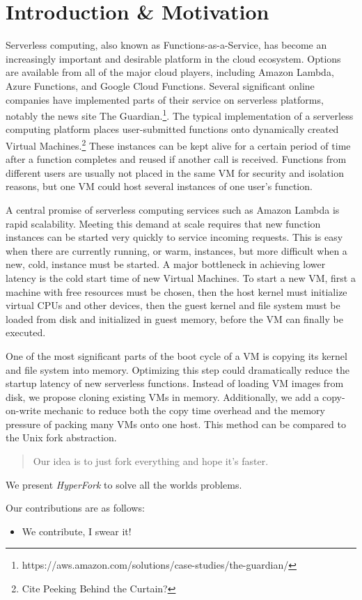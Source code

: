 \section{Introduction \& Motivation} \label{sec:intro}
Serverless computing, also known as Functions-as-a-Service, has become an increasingly important and desirable platform in the cloud ecosystem. Options are available from all of the major cloud players, including Amazon Lambda, Azure Functions, and Google Cloud Functions. Several significant online companies have implemented parts of their service on serverless platforms, notably the news site The Guardian.\footnote{https://aws.amazon.com/solutions/case-studies/the-guardian/}. The typical implementation of a serverless computing platform places user-submitted functions onto dynamically created Virtual Machines.\footnote{Cite Peeking Behind the Curtain?} These instances can be kept alive for a certain period of time after a function completes and reused if another call is received. Functions from different users are usually not placed in the same VM for security and isolation reasons, but one VM could host several instances of one user's function.

A central promise of serverless computing services such as Amazon Lambda is rapid scalability. Meeting this demand at scale requires that new function instances can be started very quickly to service incoming requests. This is easy when there are currently running, or warm, instances, but more difficult when a new, cold, instance must be started. A major bottleneck in achieving lower latency is the cold start time of new Virtual Machines. To start a new VM, first a machine with free resources must be chosen, then the host kernel must initialize virtual CPUs and other devices, then the guest kernel and file system must be loaded from disk and initialized in guest memory, before the VM can finally be executed.

One of the most significant parts of the boot cycle of a VM is copying its kernel and file system into memory. Optimizing this step could dramatically reduce the startup latency of new serverless functions. Instead of loading VM images from disk, we propose cloning existing VMs in memory. Additionally, we add a copy-on-write mechanic to reduce both the copy time overhead and the memory pressure of packing many VMs onto one host. This method can be compared to the Unix fork abstraction.


\begin{quote}
Our idea is to just fork everything and hope it's faster.
\end{quote}

We present \emph{HyperFork} to solve all the worlds problems.

Our contributions are as follows:
\begin{itemize}
\item We contribute, I swear it!

\end{itemize}
